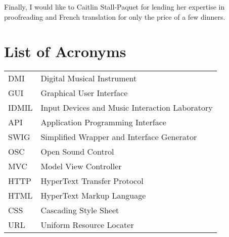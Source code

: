 \documentclass [12pt,letterpaper]{report}
\begin{document}
Finally, I would like to Caitlin Stall-Paquet for lending her expertise in proofreading and French translation for only the price of a few dinners.

\pagebreak


\tableofcontents
\listoffigures

\listoftables

\newpage
\chapter*{List of Acronyms}

\begin{longtable}{ll}
    DMI 	& 	Digital Musical Instrument\\
    GUI		& 	Graphical User Interface\\
    IDMIL &   Input Devices and Music Interaction Laboratory\\ 
    API   &   Application Programming Interface\\
    SWIG  &   Simplified Wrapper and Interface Generator\\
    OSC   &   Open Sound Control\\
    MVC   &   Model View Controller\\
    HTTP  &   HyperText Transfer Protocol\\
    HTML  &   HyperText Markup Language\\
    CSS   &   Cascading Style Sheet\\
    URL   &   Uniform Resource Locater\\
\end{longtable}

\cleardoublepage
{}

%
%
\typeout{}

%
\typeout{}

%
\typeout{}

%
\typeout{}

%
\typeout{}

%
\typeout{}




%
%

\typeout{}
    \renewcommand\refname{References}
    \nocite{*}
    
\end{document}
